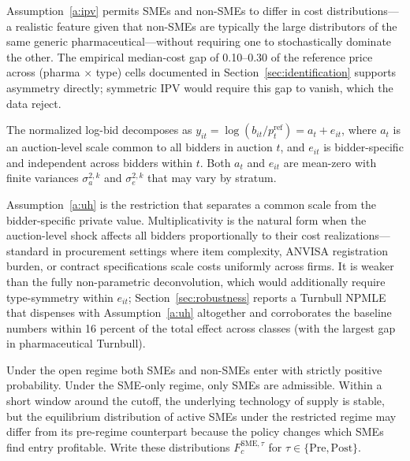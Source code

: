 Assumption~\ref{a:ipv} permits SMEs and non-SMEs to differ in cost distributions---a realistic feature given that non-SMEs are typically the large distributors of the same generic pharmaceutical---without requiring one to stochastically dominate the other. The empirical median-cost gap of 0.10--0.30 of the reference price across (pharma $\times$ type) cells documented in Section~\ref{sec:identification} supports asymmetry directly; symmetric IPV would require this gap to vanish, which the data reject.

\begin{assumption}\label{a:uh}
The normalized log-bid decomposes as $y_{it} = \log(b_{it} / p_t^{\mathrm{ref}}) = a_t + e_{it}$, where $a_t$ is an auction-level scale common to all bidders in auction $t$, and $e_{it}$ is bidder-specific and independent across bidders within $t$. Both $a_t$ and $e_{it}$ are mean-zero with finite variances $\sigma_a^{2,k}$ and $\sigma_e^{2,k}$ that may vary by stratum.
\end{assumption}

Assumption~\ref{a:uh} is the \citet{krasnokutskaya2011} restriction that separates a common scale from the bidder-specific private value. Multiplicativity is the natural form when the auction-level shock affects all bidders proportionally to their cost realizations---standard in procurement settings where item complexity, ANVISA registration burden, or contract specifications scale costs uniformly across firms. It is weaker than the fully non-parametric \citet{kotlarski1967} deconvolution, which would additionally require type-symmetry within $e_{it}$; Section~\ref{sec:robustness} reports a Turnbull NPMLE that dispenses with Assumption~\ref{a:uh} altogether and corroborates the baseline numbers within 16 percent of the total effect across classes (with the largest gap in pharmaceutical Turnbull).

\begin{assumption}\label{a:setaside}
Under the open regime both SMEs and non-SMEs enter with strictly positive probability. Under the SME-only regime, only SMEs are admissible. Within a short window around the cutoff, the underlying technology of supply is stable, but the equilibrium distribution of active SMEs under the restricted regime may differ from its pre-regime counterpart because the policy changes which SMEs find entry profitable. Write these distributions $F_c^{\text{SME},\tau}$ for $\tau \in \{\text{Pre},\text{Post}\}$.
\end{assumption}

